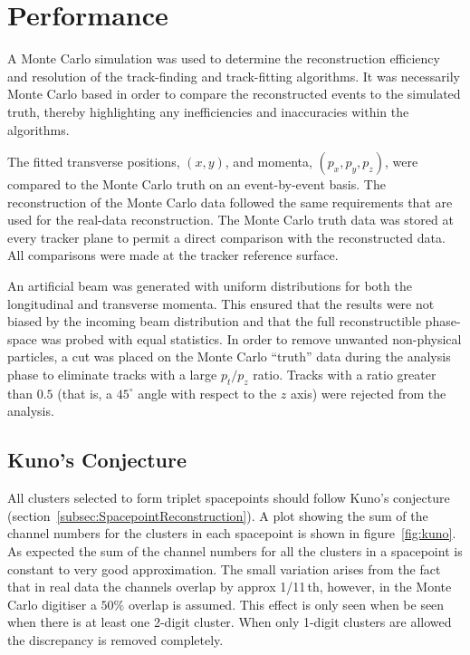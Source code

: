 \section{Performance}
\label{sec:Performance}

  A Monte Carlo simulation was used to determine the reconstruction efficiency and resolution of the track-finding and track-fitting algorithms. It was necessarily Monte Carlo based in order to compare the reconstructed events to the simulated truth, thereby highlighting any inefficiencies and inaccuracies within the algorithms.

  The fitted transverse positions, $(x,y)$, and momenta, $(p_x, p_y, p_z)$, were compared to the Monte Carlo truth on an event-by-event basis. The reconstruction of the Monte Carlo data followed the same requirements that are used for the real-data reconstruction. The Monte Carlo truth data was stored at every tracker plane to permit a direct comparison with the reconstructed data. All comparisons were made at the tracker reference surface. %

  An artificial beam was generated with uniform distributions for both the longitudinal and transverse momenta. This ensured that the results were not biased by the incoming beam distribution and that the full reconstructible phase-space was probed with equal statistics. In order to remove unwanted non-physical particles, a cut was placed on the Monte Carlo ``truth'' data during the analysis phase to eliminate tracks with a large $p_t/p_z$ ratio. Tracks with a ratio greater than $0.5$ (that is, a $45^\circ$ angle with respect to the $z$ axis) were rejected from the analysis.
  
  \subsection{Kuno's Conjecture}
  \label{sec:performance:kunos_conjecture}
  
  All clusters selected to form triplet spacepoints should follow Kuno's conjecture (section~\ref{subsec:SpacepointReconstruction}). A plot showing the sum of the channel numbers for the clusters in each spacepoint is shown in figure~\ref{fig:kuno}. As expected the sum of the channel numbers for all the clusters in a spacepoint is constant to very good approximation.  The small variation arises from the fact that in real data the channels overlap by approx 1/11\,th, however, in the Monte Carlo digitiser a $50\%$ overlap is assumed. This effect is only seen when be seen when there is at least one 2-digit cluster. When only 1-digit clusters are allowed the discrepancy is removed completely.

